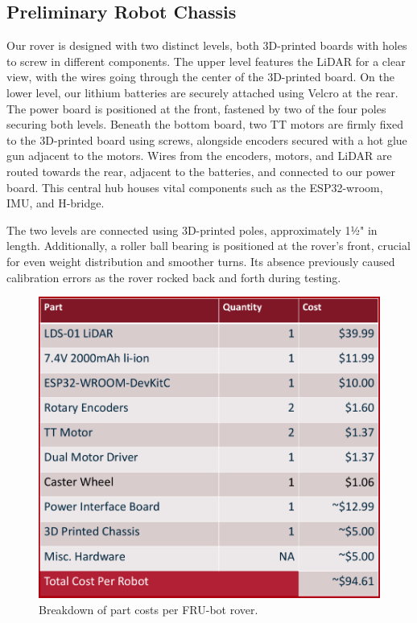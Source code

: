 \documentclass[conference]{IEEEtran}
\begin{document}
\subsection{Preliminary Robot Chassis}

Our rover is designed with two distinct levels, both 3D-printed boards with holes to screw in different components. The upper level features the LiDAR for a clear view, with the wires going through the center of the 3D-printed board.
On the lower level, our lithium batteries are securely attached using Velcro at the rear. The power board is positioned at the front, fastened by two of the four poles securing both levels.
Beneath the bottom board,  two TT motors are firmly fixed to the 3D-printed board using screws, alongside encoders secured with a hot glue gun adjacent to the motors. Wires from the encoders, motors, and LiDAR are routed towards the rear, adjacent to the batteries, and connected to our power board. This central hub houses vital components such as the ESP32-wroom, IMU, and H-bridge.

The two levels are connected using 3D-printed poles, approximately 1½" in length. Additionally, a roller ball bearing is positioned at the rover's front, crucial for even weight distribution and smoother turns. Its absence previously caused calibration errors as the rover rocked back and forth during testing.
\begin{figure}[H]
	\includegraphics[width=\linewidth]{./figs/parts.png}
	\caption{Breakdown of part costs per FRU-bot rover.}
\end{figure}
\end{document}
